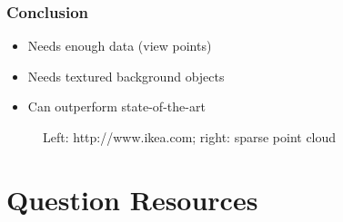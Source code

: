 \documentclass{beamer}
\begin{document}
\begin{frame}
  \frametitle{Conclusion}
  \begin{itemize}
    \item Needs enough data (view points)
    \item Needs textured background objects
    \item Can outperform state-of-the-art
  \end{itemize}
  \pause
  \begin{figure}[htb!]
   \centering
   \caption*{\tiny Left: http://www.ikea.com; right: sparse point cloud}
   \label{fig:bjorn}
  \end{figure}
\end{frame}


\section*{Question Resources}
\end{document}
